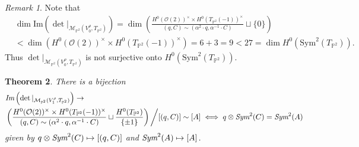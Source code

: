 \documentclass[12pt]{amsart}
\newtheorem{theorem}{Theorem}[subsection]
\theoremstyle{definition}
\theoremstyle{remark}
\newtheorem{remark}[theorem]{Remark}
\numberwithin{equation}{section}
\begin{document}
\begin{remark}\label{dimcom}
Note that \begin{align*}
&\dim \mbox{Im}\left(\det|_{\mathcal{M}_{\mathbb{P}^2}(V_0^\rho, T_{\mathbb{P}^2})}\right) = \dim \left(\frac{H^0(\mathcal{O}(2))^\times\times H^0(T_{\mathbb{P}^2}(-1))^\times}{(q, C)\sim (\alpha^2\cdot q, \alpha^{-1}\cdot C)}\sqcup\{0\}\right)\\ & < \dim \left(H^0(\mathcal{O}(2))^\times\times H^0(T_{\mathbb{P}^2}(-1))^\times\right)
= 6 + 3 = 9 < 27 = \dim H^0(\mbox{Sym}^2(T_{\mathbb{P}^2})).
\end{align*} Thus $\det|_{\mathcal{M}_{\mathbb{P}^2}(V_0^\rho, T_{\mathbb{P}^2})}$ is not surjective onto $H^0(\mbox{Sym}^2(T_{\mathbb{P}^2}))$.
\end{remark}
\begin{theorem}\label{det2}
There is a bijection 
\begin{align*}
&\emph{Im}\left(\det|_{\mathcal{M}_{\mathbb{P}^2}(V_1^\rho, T_{\mathbb{P}^2})}\right)\to\\
&\left(\frac{H^0(\mathcal{O}(2))^\times\times H^0(T_{\mathbb{P}^2}(-1))^\times}{(q, C)\sim (\alpha^2\cdot q, \alpha^{-1}\cdot C)}\sqcup\frac{H^0(T_{\mathbb{P}^2})}{\{\pm 1\}}\right)\bigg/[(q, C)]\sim [A]\iff q\otimes\emph{Sym}^2(C) = \emph{Sym}^2(A)
\end{align*} given by $q\otimes\emph{Sym}^2(C)\mapsto [(q, C)]$ and $\emph{Sym}^2(A)\mapsto [A]$.
\end{theorem}
\end{document}
